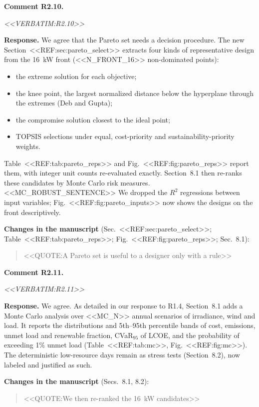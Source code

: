 \documentclass[11pt]{article}
\newcounter{rc}
\newcommand{\rcomment}[2]{\stepcounter{rc}\par\medskip
  \noindent\textbf{Comment #1.}\par
  {\color{commentgrey}\itshape #2\par}}
\newcommand{\response}[1]{\par\noindent\textbf{Response.} #1\par}
\newcommand{\change}[2]{\par\noindent\textbf{Changes in the manuscript} (#1):\par
  \begin{quote}\color{revblue}#2\end{quote}}
\begin{document}
\rcomment{R2.10}{<<VERBATIM:R2.10>>}
\response{We agree that the Pareto set needs a decision procedure. The new Section~<<REF:sec:pareto_select>> extracts four kinds of representative design from the 16~kW front (<<N_FRONT_16>> non-dominated points):
\begin{itemize}[leftmargin=*,itemsep=1pt]
\item the extreme solution for each objective;
\item the knee point, the largest normalized distance below the hyperplane through the extremes (Deb and Gupta);
\item the compromise solution closest to the ideal point;
\item TOPSIS selections under equal, cost-priority and sustainability-priority weights.
\end{itemize}
Table~<<REF:tab:pareto_reps>> and Fig.~<<REF:fig:pareto_reps>> report them, with integer unit counts re-evaluated exactly. Section~8.1 then re-ranks these candidates by Monte Carlo risk measures. <<MC_ROBUST_SENTENCE>> We dropped the $R^2$ regressions between input variables; Fig.~<<REF:fig:pareto_inputs>> now shows the designs on the front descriptively.}
\change{Sec.~<<REF:sec:pareto_select>>; Table~<<REF:tab:pareto_reps>>; Fig.~<<REF:fig:pareto_reps>>; Sec.~8.1}{<<QUOTE:A Pareto set is useful to a designer only with a rule>>}

\rcomment{R2.11}{<<VERBATIM:R2.11>>}
\response{We agree. As detailed in our response to R1.4, Section~8.1 adds a Monte Carlo analysis over <<MC_N>> annual scenarios of irradiance, wind and load. It reports the distributions and 5th--95th percentile bands of cost, emissions, unmet load and renewable fraction, CVaR$_{95}$ of LCOE, and the probability of exceeding 1\% unmet load (Table~<<REF:tab:mc>>, Fig.~<<REF:fig:mc>>). The deterministic low-resource days remain as stress tests (Section~8.2), now labeled and justified as such.}
\change{Secs.~8.1, 8.2}{<<QUOTE:We then re-ranked the 16~kW candidates>>}

\end{document}
